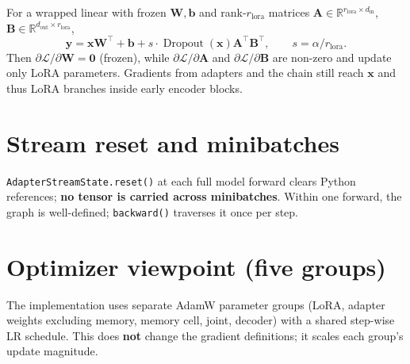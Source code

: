 \documentclass[11pt]{article}
\newcommand{\R}{\mathbb{R}}
\begin{document}
For a wrapped linear with frozen $\bm{W},\bm{b}$ and rank-$r_{\mathrm{lora}}$ matrices $\bm{A}\in\R^{r_{\mathrm{lora}}\times d_{\mathrm{in}}}$, $\bm{B}\in\R^{d_{\mathrm{out}}\times r_{\mathrm{lora}}}$,
\begin{equation}
  \bm{y} = \bm{x}\bm{W}^\top + \bm{b} + s \cdot \operatorname{Dropout}(\bm{x}) \bm{A}^\top \bm{B}^\top,
  \qquad s = \alpha / r_{\mathrm{lora}}.
\end{equation}
Then $\partial \mathcal{L}/\partial \bm{W}=\bm{0}$ (frozen), while $\partial \mathcal{L}/\partial \bm{A}$ and $\partial \mathcal{L}/\partial \bm{B}$ are non-zero and update only LoRA parameters. Gradients from adapters and the chain still reach $\bm{x}$ and thus LoRA branches inside early encoder blocks.

\section{Stream reset and minibatches}

\texttt{AdapterStreamState.reset()} at each full model forward clears Python references; \textbf{no tensor is carried across minibatches}. Within one forward, the graph is well-defined; \texttt{backward()} traverses it once per step.

\section{Optimizer viewpoint (five groups)}

The implementation uses separate AdamW parameter groups (LoRA, adapter weights excluding memory, memory cell, joint, decoder) with a shared step-wise LR schedule. This does \textbf{not} change the gradient definitions; it scales each group's update magnitude.
\end{document}
